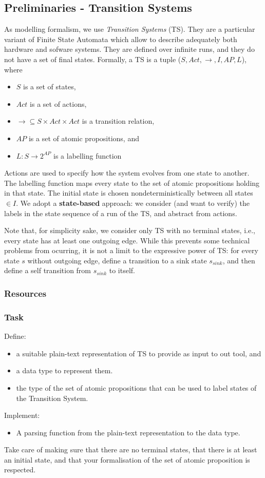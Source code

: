 \documentclass{article}
\begin{document}
\subsection{Preliminaries - Transition Systems}
As modelling formalism, we use \emph{Transition Systems} (TS). They are a particular variant 
of Finite State Automata which allow to describe adequately both hardware and sofware systems. 
They are defined over infinite runs, and they do not have a set of final states. 
Formally, a TS is a tuple ($S, Act, \rightarrow, I, AP, L$), where 
\begin{itemize}
    \item $S$ is a set of states,
    \item $Act$ is a set of actions,
    \item $\longrightarrow \subseteq S \times Act \times Act$ is a transition relation,
    \item $AP$ is a set of atomic propositions, and 
    \item $L : S \rightarrow 2^{AP}$ is a labelling function
\end{itemize}
Actions are used to specify how the system evolves from one state to another. The labelling function 
maps every state to the set of atomic propositions holding in that state. The initial state is chosen 
nondeterministically between all states $\in I$.
We adopt a \textbf{state-based} approach: we consider (and want to verify) the labels in the state sequence 
of a run of the TS, and abstract from actions. 

Note that, for simplicity sake, we consider only TS with no terminal states, i.e., every state has at least 
one outgoing edge. While this prevents some technical problems from ocurring, it is not a limit to the 
expressive power of TS: for every state $s$ without outgoing edge, define a transition to a sink state 
$s_ {sink}$, and then define a self transition from $s_ {sink}$ to itself.

\subsubsection{Resources}
\cite[Paragraph 2.1]{BaKa}

\subsubsection{Task}
Define:
\begin{itemize}
    \item a suitable plain-text representation of TS to provide as input to out tool, and
    \item a data type to represent them. 
    \item the type of the set of atomic propositions that can be used to label states of the Transition System.
\end{itemize}
Implement: 
\begin{itemize}
    \item A parsing function from the plain-text representation to the data type.
\end{itemize}
Take care of making sure that there are no terminal states, that there is at least an initial state, 
and that your formalisation of the set of atomic proposition is respected.
\end{document}
